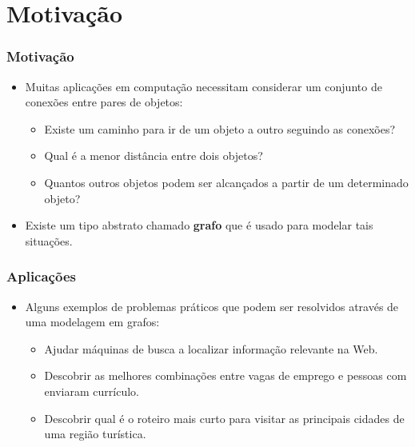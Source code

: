 \documentclass[aspectratio=169]{beamer}
\begin{document}
\section{Motivação} %

\begin{frame}
\frametitle{Motivação}
\begin{itemize}
\item Muitas aplicações em computação necessitam considerar um conjunto de conexões entre pares de objetos:
\begin{itemize}
\item Existe um caminho para ir de um objeto a outro seguindo as conexões?
\item Qual é a menor distância entre dois objetos?
\item Quantos outros objetos podem ser alcançados a partir de um determinado objeto?
\end{itemize}
\item Existe um tipo abstrato chamado {\bf grafo} que é usado para modelar tais situações.
\end{itemize}
\end{frame}


\begin{frame}
\frametitle{Aplicações}
\begin{itemize}
\item Alguns exemplos de problemas práticos que podem ser resolvidos através de uma modelagem em grafos:
\begin{itemize}
\item Ajudar máquinas de busca a localizar informação relevante na Web.
\item Descobrir as melhores combinações entre vagas de emprego e pessoas com enviaram currículo.
\item Descobrir qual é o roteiro mais curto para visitar as principais cidades de uma região turística.
\end{itemize}
\end{itemize}
\end{frame}
\end{document}
